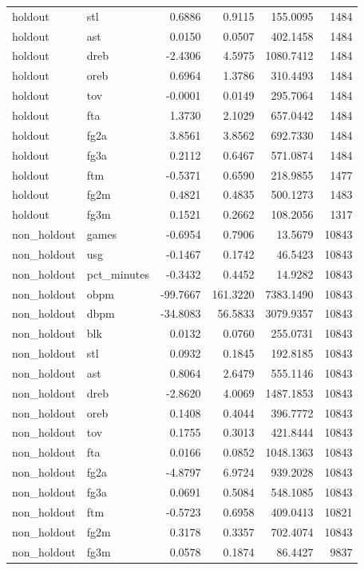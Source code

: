\begin{table}
\begin{tabular}{llrrrr}
holdout & stl & 0.6886 & 0.9115 & 155.0095 & 1484 \\
holdout & ast & 0.0150 & 0.0507 & 402.1458 & 1484 \\
holdout & dreb & -2.4306 & 4.5975 & 1080.7412 & 1484 \\
holdout & oreb & 0.6964 & 1.3786 & 310.4493 & 1484 \\
holdout & tov & -0.0001 & 0.0149 & 295.7064 & 1484 \\
holdout & fta & 1.3730 & 2.1029 & 657.0442 & 1484 \\
holdout & fg2a & 3.8561 & 3.8562 & 692.7330 & 1484 \\
holdout & fg3a & 0.2112 & 0.6467 & 571.0874 & 1484 \\
holdout & ftm & -0.5371 & 0.6590 & 218.9855 & 1477 \\
holdout & fg2m & 0.4821 & 0.4835 & 500.1273 & 1483 \\
holdout & fg3m & 0.1521 & 0.2662 & 108.2056 & 1317 \\
non\_holdout & games & -0.6954 & 0.7906 & 13.5679 & 10843 \\
non\_holdout & usg & -0.1467 & 0.1742 & 46.5423 & 10843 \\
non\_holdout & pct\_minutes & -0.3432 & 0.4452 & 14.9282 & 10843 \\
non\_holdout & obpm & -99.7667 & 161.3220 & 7383.1490 & 10843 \\
non\_holdout & dbpm & -34.8083 & 56.5833 & 3079.9357 & 10843 \\
non\_holdout & blk & 0.0132 & 0.0760 & 255.0731 & 10843 \\
non\_holdout & stl & 0.0932 & 0.1845 & 192.8185 & 10843 \\
non\_holdout & ast & 0.8064 & 2.6479 & 555.1146 & 10843 \\
non\_holdout & dreb & -2.8620 & 4.0069 & 1487.1853 & 10843 \\
non\_holdout & oreb & 0.1408 & 0.4044 & 396.7772 & 10843 \\
non\_holdout & tov & 0.1755 & 0.3013 & 421.8444 & 10843 \\
non\_holdout & fta & 0.0166 & 0.0852 & 1048.1363 & 10843 \\
non\_holdout & fg2a & -4.8797 & 6.9724 & 939.2028 & 10843 \\
non\_holdout & fg3a & 0.0691 & 0.5084 & 548.1085 & 10843 \\
non\_holdout & ftm & -0.5723 & 0.6958 & 409.0413 & 10821 \\
non\_holdout & fg2m & 0.3178 & 0.3357 & 702.4074 & 10843 \\
non\_holdout & fg3m & 0.0578 & 0.1874 & 86.4427 & 9837 \\
\bottomrule
\end{tabular}
\end{table}
